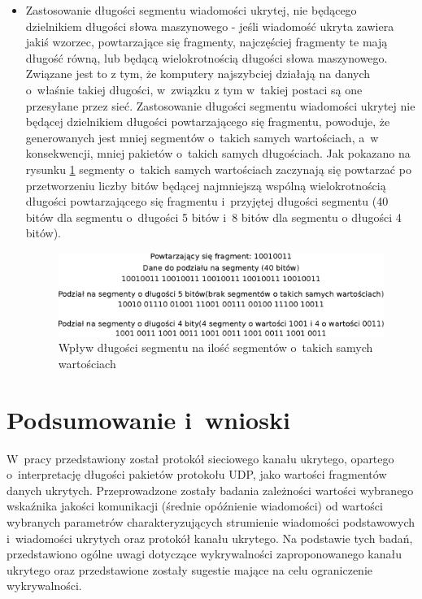 \documentclass[a4paper, twoside, openright, 12pt]{report}
\begin{document}
\begin{itemize}
           \item Zastosowanie długości segmentu wiadomości ukrytej, nie będącego
               dzielnikiem długości słowa maszynowego - jeśli wiadomość ukryta
               zawiera jakiś wzorzec, powtarzające się fragmenty, najczęściej fragmenty
               te mają długość równą, lub będącą wielokrotnością długości słowa maszynowego.
               Związane jest to z tym, że komputery najszybciej działają na danych
               o~właśnie takiej długości, w~związku z tym w~takiej postaci są one przesyłane
               przez sieć. Zastosowanie długości segmentu wiadomości ukrytej nie będącej
               dzielnikiem długości powtarzającego się fragmentu, powoduje, że generowanych
               jest mniej segmentów o~takich samych wartościach, a~w konsekwencji,
               mniej pakietów o~takich samych długościach. Jak pokazano na rysunku \ref{REPETEDFRAGMENTS}
               segmenty o~takich samych wartościach zaczynają się powtarzać po
               przetworzeniu liczby bitów będącej najmniejszą wspólną wielokrotnością
               długości powtarzającego się fragmentu i~przyjętej długości segmentu
               (40 bitów dla segmentu o~długości 5 bitów i~8 bitów dla segmentu o
               długości 4 bitów).

                \begin{figure}[h]
                        \centering
                        \includegraphics[scale=0.75]{powtorzone_fragmenty}
                        \caption{Wpływ długości segmentu na ilość segmentów o~takich samych wartościach}
                        \label{REPETEDFRAGMENTS}
                \end{figure}
       \end{itemize}


\chapter{Podsumowanie i~wnioski}
    W~pracy przedstawiony został protokół sieciowego kanału ukrytego,
    opartego o~interpretację długości pakietów protokołu UDP, jako wartości fragmentów
    danych ukrytych. Przeprowadzone zostały badania zależności wartości wybranego
    wskaźnika jakości komunikacji (średnie opóźnienie wiadomości) od wartości wybranych
    parametrów charakteryzujących strumienie wiadomości podstawowych i~wiadomości ukrytych
    oraz protokół kanału ukrytego.  Na podstawie tych badań, przedstawiono ogólne
    uwagi dotyczące wykrywalności zaproponowanego kanału ukrytego oraz przedstawione
    zostały sugestie mające na celu ograniczenie wykrywalności.
\end{document}
